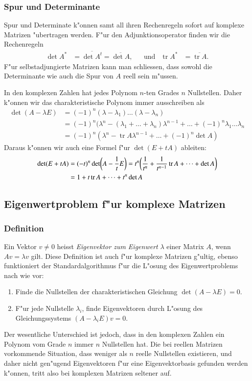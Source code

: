 \subsubsection{Spur und Determinante}
Spur und Determinate k"onnen samt all ihren Rechenregeln sofort auf
komplexe Matrizen "ubertragen werden.
F"ur den Adjunktionsoperator finden wir die Rechenregeln
\[
\begin{aligned}
\det A^*&= \overline{\det A^t}=\overline{\det A},
&&\text{und}&
\operatorname{tr} A^*&=\overline{\operatorname{tr}A}.
\end{aligned}
\]
F"ur selbstadjungierte Matrizen kann man schliessen, dass sowohl
die Determinante wie auch die Spur von $A$ reell sein m"ussen.

In den komplexen Zahlen hat jedes Polynom $n$-ten Grades $n$ Nullstellen.
Daher k"onnen wir das charakteristische Polynom immer ausschreiben als
\begin{align*}
\det(A-\lambda E)
&=
(-1)^n (\lambda-\lambda_1)\dots(\lambda-\lambda_n)
\\
&=
(-1)^n(\lambda^n -(\lambda_1+\dots+\lambda_n)\lambda^{n-1}+\dots
+(-1)^n\lambda_1\dots\lambda_n
\\
&=
(-1)^n(\lambda^n - \operatorname{tr}A\lambda^{n-1}+\dots + (-1)^n\det A)
\end{align*}
Daraus k"onnen wir auch eine Formel f"ur $\det(E+tA)$ ableiten:
\begin{align}
\det(E+tA)
&=
(-t)^n\det\biggl(A-\frac1tE\biggr)
=
t^n\biggl(
\frac1{t^n}+\frac1{t^{n-1}}\operatorname{tr}A+\dots+\det A
\biggr)
\notag
\\
&=
1+t\operatorname{tr}A+\dots+t^n\operatorname{det}A
\label{skript:detandtrace}
\end{align}

%
%
\subsection{Eigenwertproblem f"ur komplexe Matrizen}
\subsubsection{Definition}
Ein Vektor $v\ne 0$ heisst {\em Eigenvektor zum Eigenwert} $\lambda$ einer
Matrix $A$, wenn $Av=\lambda v$ gilt. Diese Definition ist auch f"ur
komplexe Matrizen g"ultig, ebenso funktioniert der Standardalgorithmus
f"ur die L"osung des Eigenwertproblems nach wie vor:
\begin{enumerate}
\item Finde die Nullstellen der charakteristischen Gleichung
$\det(A-\lambda E)=0$.
\item F"ur jede Nullstelle $\lambda_i$, finde Eigenvektoren
durch L"osung des Gleichungssystems $(A-\lambda_i E)v=0$.
\end{enumerate}
Der wesentliche Unterschied ist jedoch, dass in den komplexen
Zahlen ein Polynom vom Grade $n$ immer $n$ Nullstellen hat.
Die bei reellen Matrizen vorkommende Situation, dass weniger
als $n$ reelle Nullstellen existieren, und daher nicht gen"ugend
Eigenvektoren f"ur eine Eigenvektorbasis gefunden werden k"onnen,
tritt also bei komplexen Matrizen seltener auf.

